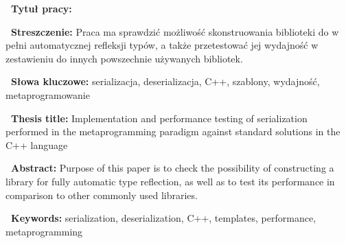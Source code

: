 \documentclass[12pt]{article}
\newcommand{\polishkeywords}{serializacja, deserializacja, C++, szablony, wydajność, metaprogramowanie}
\newcommand{\disablewordwrap}{%
	\setlength{\hsize}{0.9\hsize}
	\hyphenpenalty=10000
	\hbadness=10000}
\begin{document}
	{
		\disablewordwrap
		\large

		\vspace*{\vfill}

		{\bfseries\ Tytuł pracy:} \MyTitle

		\vspace*{\vfill}

		{\bfseries\ Streszczenie:} Praca ma sprawdzić możliwość skonstruowania biblioteki do w pełni automatycznej refleksji typów, a także przetestować jej wydajność w zestawieniu do innych powszechnie używanych bibliotek.

		\vspace*{\vfill}

		{\bfseries\ Słowa kluczowe:} \polishkeywords

		\vspace*{\vfill}

		{\bfseries\ Thesis title:} Implementation and performance testing of serialization performed in the metaprogramming paradigm against standard solutions in the C++ language

		\vspace*{\vfill}

		{\bfseries\ Abstract:} Purpose of this paper is to check the possibility of constructing a library for fully automatic type reflection, as well as to test its performance in comparison to other commonly used libraries.

		\vspace*{\vfill}

		{\bfseries\ Keywords:} serialization, deserialization, C++, templates, performance, metaprogramming

		\vspace*{\vfill}

		\thispagestyle{empty}
		\newpage
	}

	{
		 \vspace*{\vfill}
		\thispagestyle{empty}
		\newpage
	}

	{
		\tableofcontents
		\thispagestyle{fancy}
		\newpage
	}
\end{document}
